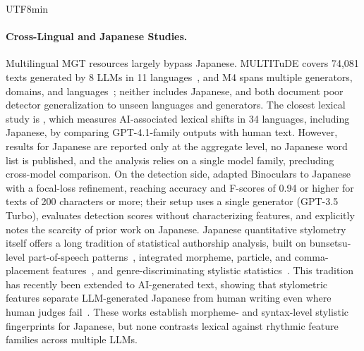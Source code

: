 \documentclass[11pt,a4paper]{article}
\begin{document}
\begin{CJK}{UTF8}{min}
\paragraph{Cross-Lingual and Japanese Studies.}
Multilingual MGT resources largely bypass Japanese. MULTITuDE covers 74{,}081 texts generated by 8 LLMs in 11 languages~\citep{macko2023multitude}, and M4 spans multiple generators, domains, and languages~\citep{wang2024m4}; neither includes Japanese, and both document poor detector generalization to unseen languages and generators. The closest lexical study is \citet{juzek2026lexical}, which measures AI-associated lexical shifts in 34 languages, including Japanese, by comparing GPT-4.1-family outputs with human text. However, results for Japanese are reported only at the aggregate level, no Japanese word list is published, and the analysis relies on a single model family, precluding cross-model comparison. On the detection side, \citet{iwata2025jsai} adapted Binoculars to Japanese with a focal-loss refinement, reaching accuracy and F-scores of 0.94 or higher for texts of 200 characters or more; their setup uses a single generator (GPT-3.5 Turbo), evaluates detection scores without characterizing features, and explicitly notes the scarcity of prior work on Japanese. Japanese quantitative stylometry itself offers a long tradition of statistical authorship analysis, built on bunsetsu-level part-of-speech patterns~\citep{jin2013bunsetsu}, integrated morpheme, particle, and comma-placement features~\citep{jin2014integrated}, and genre-discriminating stylistic statistics~\citep{ishida2004academic}. This tradition has recently been extended to AI-generated text, showing that stylometric features separate LLM-generated Japanese from human writing even where human judges fail~\citep{zaitsu2023chatgpt, zaitsu2025stylometry}. These works establish morpheme- and syntax-level stylistic fingerprints for Japanese, but none contrasts lexical against rhythmic feature families across multiple LLMs.


\end{CJK}
\end{document}
